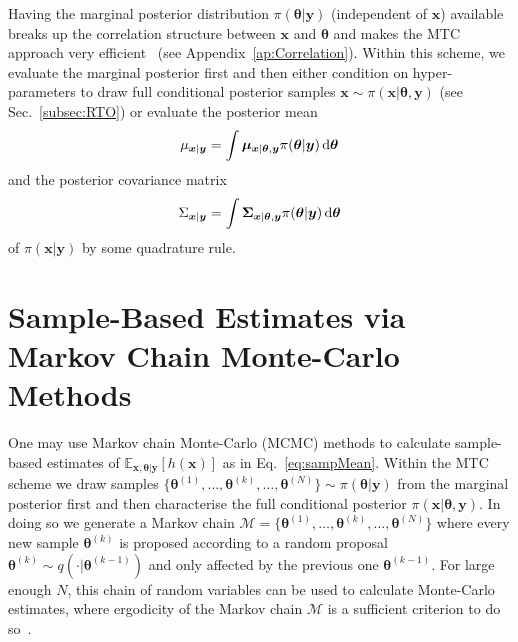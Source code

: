 Having the marginal posterior distribution $\pi (\bm{\theta}| \bm{y})$ (independent of $\bm{x}$) available breaks up the correlation structure between $\bm{x}$ and $\bm{\theta}$ and makes the MTC approach very efficient~\cite{fox2016fast} (see Appendix~\ref{ap:Correlation}).
Within this scheme, we evaluate the marginal posterior first and then either condition on hyper-parameters to draw full conditional posterior samples $\bm{x} \sim \pi (\bm{x} | \bm{\theta}, \bm{y})$ (see Sec.~\ref{subsec:RTO}) or evaluate the posterior mean
\begin{align}
	\mu_{\bm{x}|\bm{y}} = \int \bm{\mu}_{\bm{x} | \bm{\theta} , \bm{y}} \pi(\bm{\theta}| \bm{y}) \mathop{}\!\mathrm{d} \bm{\theta} \label{eq:MeanGenInt}
\end{align} and the posterior covariance matrix
\begin{align}
	\Sigma_{\bm{x}|\bm{y}} = \int \bm{\Sigma}_{\bm{x} | \bm{\theta} , \bm{y}} \pi(\bm{\theta}| \bm{y}) \mathop{}\!\mathrm{d} \bm{\theta}\label{eq:CoVarGenInt}
\end{align}
of $\pi(\bm{x}| \bm{y})$ by some quadrature rule.

\section{Sample-Based Estimates via Markov Chain Monte-Carlo Methods}
One may use Markov chain Monte-Carlo (MCMC) methods to calculate sample-based estimates of $\mathbb{E}_{\bm{x} ,\bm{\theta}  |\bm{y}} [h(\bm{x})] $ as in Eq.~\ref{eq:sampMean}.
Within the MTC scheme we draw samples $\{  \bm{\theta}^{(1)}, \dots,  \bm{\theta}^{(k)}, \dots, \bm{\theta}^{(N)} \} \sim \pi(\bm{\theta} | \bm{y})$ from the marginal posterior first and then characterise the full conditional posterior $\pi(\bm{x}|\bm{\theta} , \bm{y})$.
In doing so we generate a Markov chain $\mathcal{M} = \{  \bm{\theta}^{(1)}, \dots,  \bm{\theta}^{(k)}, \dots, \bm{\theta}^{(N)} \} $ where every new sample $\bm{\theta}^{(k)}$ is proposed according to a random proposal $\bm{\theta}^{(k)} \sim q( \cdot |  \bm{\theta}^{(k-1)})$ and only affected by the previous one $\bm{\theta}^{(k-1)}$.
For large enough $N$, this chain of random variables can be used to calculate Monte-Carlo estimates, where ergodicity of the Markov chain $\mathcal{M}$ is a sufficient criterion to do so~\cite{tan2016LecNot, roberts2004general}.

